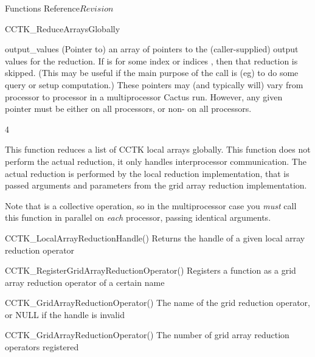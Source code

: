 \begin{cactuspart}{ Functions Reference}{}{$Revision$}
\begin{FunctionDescription}{CCTK\_ReduceArraysGlobally}
\begin{ParameterSection}
\begin{Parameter}{output\_values}
(Pointer to) an array of    pointers to the
(caller-supplied) output values for the reduction.
If   is  for some index or indices   ,
then that reduction is skipped.  (This may be useful if the main
purpose of the call is (eg) to do some query or setup computation.)
These pointers may (and typically will) vary from processor to
processor in a multiprocessor Cactus run.  However, any given pointer
must be either  on all processors, or non- on all processors.
\end{Parameter}
\end{ParameterSection}4

\begin{Discussion}
This function reduces a list of CCTK local arrays globally. This function does not perform the actual reduction, it only handles interprocessor communication. The actual reduction is performed by the local reduction implementation, that is passed arguments and parameters
from the grid array reduction implementation.

Note that  is a collective operation, so in the
multiprocessor case you {\em must\/} call this function in parallel on
{\em each\/} processor, passing identical arguments.
\end{Discussion}

\begin{SeeAlsoSection}
\begin{SeeAlso}{CCTK\_LocalArrayReductionHandle()}
Returns the handle of a given local array reduction operator
\end{SeeAlso}

\begin{SeeAlso}{CCTK\_RegisterGridArrayReductionOperator()}
Registers a function as a grid array reduction operator of a certain name
\end{SeeAlso}

\begin{SeeAlso}{CCTK\_GridArrayReductionOperator()}
The name of the grid reduction operator, or NULL if the handle is invalid
\end{SeeAlso}

\begin{SeeAlso}{CCTK\_GridArrayReductionOperator()}
The number of grid array reduction operators registered
\end{SeeAlso}
\end{SeeAlsoSection}


\end{FunctionDescription}
\end{cactuspart}
